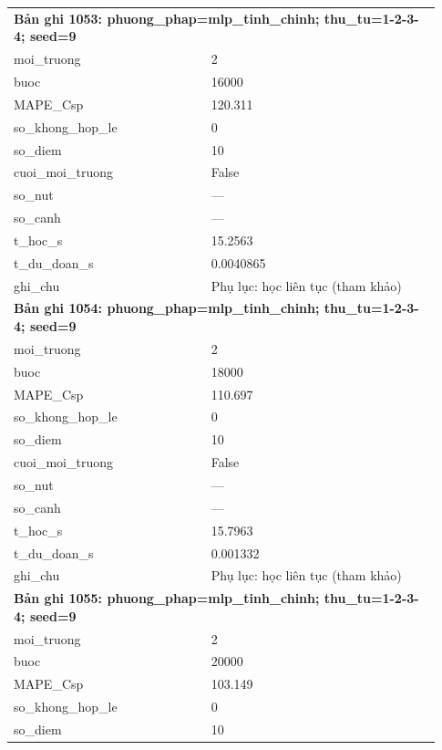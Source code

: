 \begin{longtable}{p{0.43\linewidth}p{0.50\linewidth}}
\midrule
\multicolumn{2}{p{0.95\linewidth}}{\textbf{Bản ghi 1053: phuong\_phap=mlp\_tinh\_chinh; thu\_tu=1-2-3-4; seed=9}} \\
moi\_\allowbreak truong & 2 \\
buoc & 16000 \\
MAPE\_\allowbreak Csp & 120.311 \\
so\_\allowbreak khong\_\allowbreak hop\_\allowbreak le & 0 \\
so\_\allowbreak diem & 10 \\
cuoi\_\allowbreak moi\_\allowbreak truong & False \\
so\_\allowbreak nut & — \\
so\_\allowbreak canh & — \\
t\_\allowbreak hoc\_\allowbreak s & 15.2563 \\
t\_\allowbreak du\_\allowbreak doan\_\allowbreak s & 0.0040865 \\
ghi\_\allowbreak chu & Phụ lục: học liên tục (tham khảo) \\
\midrule
\multicolumn{2}{p{0.95\linewidth}}{\textbf{Bản ghi 1054: phuong\_phap=mlp\_tinh\_chinh; thu\_tu=1-2-3-4; seed=9}} \\
moi\_\allowbreak truong & 2 \\
buoc & 18000 \\
MAPE\_\allowbreak Csp & 110.697 \\
so\_\allowbreak khong\_\allowbreak hop\_\allowbreak le & 0 \\
so\_\allowbreak diem & 10 \\
cuoi\_\allowbreak moi\_\allowbreak truong & False \\
so\_\allowbreak nut & — \\
so\_\allowbreak canh & — \\
t\_\allowbreak hoc\_\allowbreak s & 15.7963 \\
t\_\allowbreak du\_\allowbreak doan\_\allowbreak s & 0.001332 \\
ghi\_\allowbreak chu & Phụ lục: học liên tục (tham khảo) \\
\midrule
\multicolumn{2}{p{0.95\linewidth}}{\textbf{Bản ghi 1055: phuong\_phap=mlp\_tinh\_chinh; thu\_tu=1-2-3-4; seed=9}} \\
moi\_\allowbreak truong & 2 \\
buoc & 20000 \\
MAPE\_\allowbreak Csp & 103.149 \\
so\_\allowbreak khong\_\allowbreak hop\_\allowbreak le & 0 \\
so\_\allowbreak diem & 10 \\

\end{longtable}
